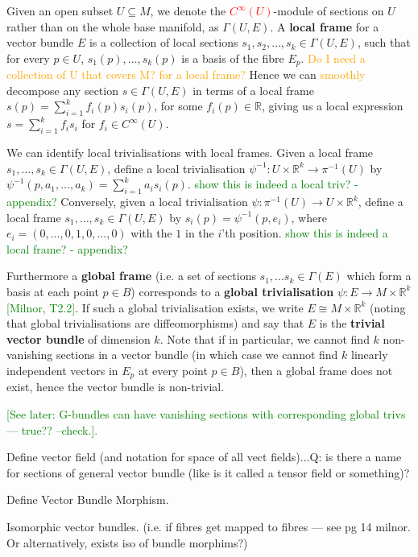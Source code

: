 \documentclass[a4paper]{article}
\theoremstyle{definition} \newtheorem*{definition}{Definition}
\theoremstyle{definition} \newtheorem*{definitions}{Definitions}
\theoremstyle{plain} \newtheorem{theorem}{Theorem}[section]
\theoremstyle{plain} \newtheorem{proposition}[theorem]{Proposition}
\theoremstyle{plain} \newtheorem{corollary}[theorem]{Corollary}
\theoremstyle{plain} \newtheorem{lemma}[theorem]{Lemma}
\theoremstyle{plain} \newtheorem{example}[theorem]{Example}
\newcommand{\checkCorrect}[1]{\textcolor{red}{#1}}
\newcommand{\understandBetter}[1]{\textcolor{orange}{#1}}
\newcommand{\question}[1]{\textcolor{orange}{#1}}
\newcommand{\finish}[1]{\textcolor{green}{#1}}
\newcommand{\defn}[1]{\textbf{#1}}
\newcommand{\realnos}{\mathbb{R}}
\begin{document}
Given an open subset $U\subseteq M$, we denote the \checkCorrect{$C^\infty (U)$}-module of sections on $U$ rather than on the whole base manifold, as $\Gamma (U, E)$. A \defn{local frame} for a vector bundle $E$ is a collection of local sections $s_1, s_2, \ldots, s_k\in \Gamma (U, E)$, such that for every $p\in U$, $s_1(p),\ldots, s_k(p)$ is a basis of the fibre $E_p$. \question{Do I need a collection of U that covers M? for a local frame?} Hence we can \understandBetter{smoothly} decompose any section $s\in \Gamma(U, E)$ in terms of a local frame $s(p)=\sum_{i=1}^k f_i(p)s_i(p)$, for some $f_i(p)\in \realnos$, giving us a local expression $s=\sum_{i=1}^k f_i s_i$ for $f_i\in C^\infty(U)$. 

We can identify local trivialisations with local frames. Given a local frame $s_1, \ldots, s_k\in \Gamma(U, E)$, define a local trivialisation $\psi^{-1}:U\times \realnos^k \to \pi^{-1}(U)$ by
$\psi^{-1}(p, a_1, \ldots, a_k) = \sum_{i=1}^k a_is_i(p)$. \finish{show this is indeed a local triv? - appendix?} Conversely, given a local trivialisation $\psi:\pi^{-1}(U) \to U\times \realnos^k$, define a local frame $s_1,\ldots , s_k\in \Gamma(U, E)$ by $s_i(p)=\psi^{-1} (p, e_i)$, where $e_i = (0, \ldots, 0, 1, 0, \ldots, 0)$ with the $1$ in the $i$'th position. \finish{show this is indeed a local frame? - appendix?}

Furthermore a \defn{global frame} (i.e. a set of sections $s_1, \ldots s_k\in \Gamma(E)$ which form a basis at each point $p\in B$) corresponds to a \defn{global trivialisation} $\psi:E \to M\times \realnos^k$ \finish{[Milnor, T2.2]}. If such a global trivialisation exists, we write $E\cong M\times \realnos^k$ (noting that global trivialisations are diffeomorphisms) and say that $E$ is the \defn{trivial vector bundle} of dimension $k$. 
Note that if in particular, we cannot find $k$ non-vanishing sections in a vector bundle (in which case we cannot find $k$ linearly independent vectors in $E_p$ at every point $p\in B$), then a global frame does not exist, hence the vector bundle is non-trivial.  

\finish{[See later: G-bundles can have vanishing sections with corresponding global trivs --- true?? --check.].}

Define vector field (and notation for space of all vect fields)...Q: is there a name for sections of general vector bundle (like is it called a tensor field or something)?


Define Vector Bundle Morphism.

Isomorphic vector bundles. (i.e. if fibres get mapped to fibres --- see pg 14 milnor. Or alternatively, exists iso of bundle morphims?)
\end{document}
